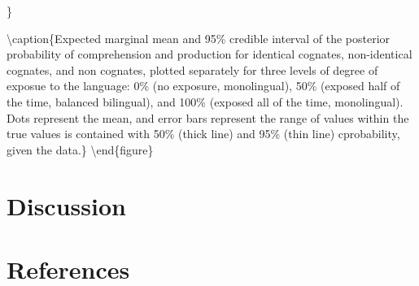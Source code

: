 \documentclass[
  english,
  man,man,floatsintext]{apa6}
\begin{document}
\}

\textbackslash caption\{Expected marginal mean and 95\% credible interval of the posterior probability of comprehension and production for identical cognates, non-identical cognates, and non cognates, plotted separately for three levels of degree of exposue to the language: 0\% (no exposure, monolingual), 50\% (exposed half of the time, balanced bilingual), and 100\% (exposed all of the time, monolingual). Dots represent the mean, and error bars represent the range of values within the true values is contained with 50\% (thick line) and 95\% (thin line) cprobability, given the data.\}\label{fig:emmeans}
\textbackslash end\{figure\}

\hypertarget{discussion}{%
\section{Discussion}\label{discussion}}

\hypertarget{references}{%
\section{References}\label{references}}

\begingroup
\setlength{\parindent}{-0.5in}
\setlength{\leftskip}{0.5in}
\end{document}
